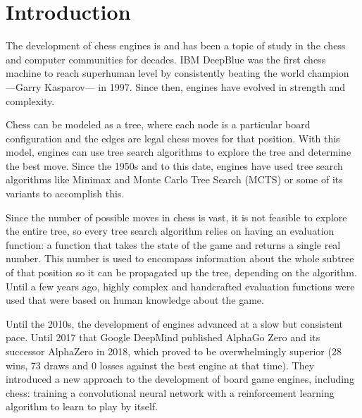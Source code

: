 \section{Introduction}



The development of chess engines is and has been a topic of study in the chess and computer communities for decades. IBM DeepBlue \cite{deepblue:2002} was the first chess machine to reach superhuman level by consistently beating the world champion ---Garry Kasparov--- in 1997. Since then, engines have evolved in strength and complexity.

Chess can be modeled as a tree, where each node is a particular board configuration and the edges are legal chess moves for that position. With this model, engines can use tree search algorithms to explore the tree and determine the best move. Since the 1950s and to this date, engines have used tree search algorithms like Minimax \cite{minimax-survey:1995} and Monte Carlo Tree Search \cite{mcts-survey:2012} (MCTS) or some of its variants \cite{tree-search-methods:2014,mcts-modifications:2022} to accomplish this.

Since the number of possible moves in chess is vast, it is not feasible to explore the entire tree, so every tree search algorithm relies on having an evaluation function: a function that takes the state of the game and returns a single real number. This number is used to encompass information about the whole subtree of that position so it can be propagated up the tree, depending on the algorithm. Until a few years ago, highly complex and handcrafted evaluation functions were used that were based on human knowledge about the game.

Until the 2010s, the development of engines advanced at a slow but consistent pace. Until 2017 that Google DeepMind published AlphaGo Zero \cite{alphagozero:2017} and its successor AlphaZero \cite{alphazero:2017,alphazero:2018} in 2018, which proved to be overwhelmingly superior (28 wins, 73 draws and 0 losses against the best engine at that time). They introduced a new approach to the development of board game engines, including chess: training a convolutional neural network with a reinforcement learning algorithm to learn to play by itself.

